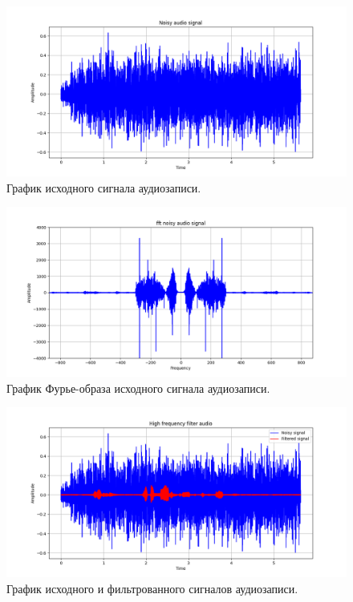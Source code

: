 \documentclass[a4paper, 12pt]{article}
\begin{document}
    \begin{figure}[!htb]
        \centering
        \includegraphics[scale=0.485]{noisy_audio.png}
        \captionsetup{skip=0pt}
        \caption{График исходного сигнала аудиозаписи.}
        \label{fig:fig111}
    \end{figure}
    \begin{figure}[!htb]
        \centering
        \includegraphics[scale=0.485]{U_audio.png}
        \captionsetup{skip=0pt}
        \caption{График Фурье-образа исходного сигнала аудиозаписи.}
        \label{fig:fig112}
    \end{figure}
    \begin{figure}[!htb]
        \centering
        \includegraphics[scale=0.485]{u_flt_u_audio.png}
        \captionsetup{skip=0pt}
        \caption{График исходного и фильтрованного сигналов аудиозаписи.}
        \label{fig:fig113}
    \end{figure}
\end{document}
